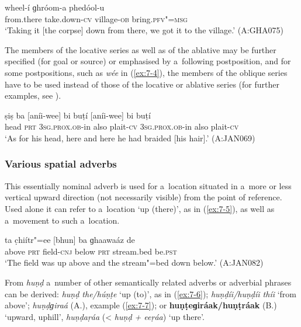 \begin{exe}
\ex
\label{ex:7-3}
\gll [eetáai] wheel-í ɡhróom-a phedóol-u \\
from.there take.down-\textsc{cv} village-\textsc{ob} bring.\textsc{pfv"=msg} \\
\glt `Taking it [the corpse] down from there, we got it to the village.' (A:GHA075)
\end{exe}
The members of the locative series as well as of the ablative may be further specified (for goal or
source) or emphasised by a~following postposition, and for some postpositions, such as \textit{wée}
in (\ref{ex:7-4}), the members of the oblique series have to be used instead of those of the
locative or ablative series (for further examples, see ).

\begin{exe}
\ex
\label{ex:7-4}
\gll ṣiṣ ba [aníi-wee] bi buṭí [aníi-wee]  bi buṭí \\
head \textsc{prt} \textsc{3sg.prox.ob-}in also plait-\textsc{cv} \textsc{3sg.prox.ob-}in also plait-\textsc{cv} \\
\glt `As for his head, here and here he had braided [his hair].' (A:JAN069)
\end{exe}

\subsubsection*{Various spatial adverbs}

 This essentially nominal adverb is used for a~location situated in a~more or less vertical upward direction (not necessarily visible) from the point of reference. Used alone it can refer to a~location `up (there)', as in (\ref{ex:7-5}), as well as a~movement to such a~location.

\begin{exe}
\ex
\label{ex:7-5}
\gll [huṇḍ] ta c̣hiítr"=ee [bhun] ba ɡhaawaáz de  \\
above \textsc{prt} field-\textsc{cnj} below \textsc{prt} stream.bed be.\textsc{pst} \\
\glt `The field was up above and the stream"=bed down below.' (A:JAN082)
\end{exe}
From \textit{huṇḍ} a~number of other semantically related adverbs or adverbial phrases can be derived: \textit{huṇḍ the/húṇṭe} `up (to)', as in (\ref{ex:7-6}); \textit{huṇḍíi/huṇḍíi thíi} `from above'; \textit{huṇḍɡiraá} (A.), example (\ref{ex:7-7}); or \textbf{huṇṭeɡiráak/huṇṭráak} (B.) `upward, uphill', \textit{huṇḍaṛáa} ({\textless} \textit{huṇḍ + eeṛáa}) `up there'.

